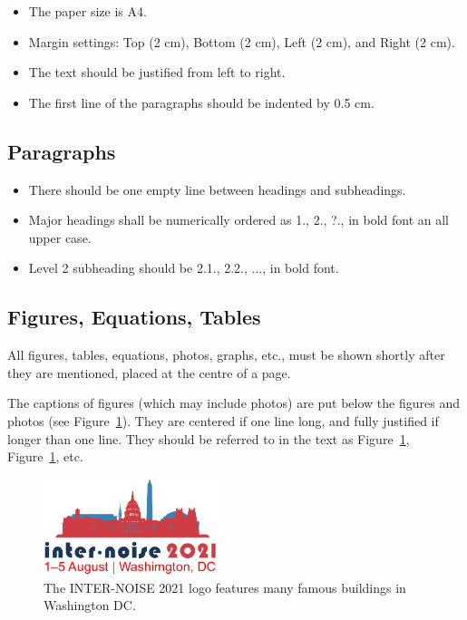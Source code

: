 \begin{itemize}[noitemsep]
\item The paper size is A4.
\item Margin settings: Top (2 cm), Bottom (2 cm), Left (2 cm), and Right (2 cm).
\item The text should be justified from left to right.
\item The first line of the paragraphs should be indented by 0.5 cm. 
\end{itemize}

\subsection{Paragraphs}

\begin{itemize}[noitemsep]
\item There should be one empty line between headings and subheadings.
\item Major headings shall be numerically ordered as 1., 2., ?., in bold font an all upper case.
\item Level 2 subheading should be 2.1., 2.2., ..., in bold font.
\end{itemize}

\subsection{Figures, Equations, Tables} \label{sec.figs}

\noindent
All figures, tables, equations, photos, graphs, etc., must be shown shortly after they are mentioned, placed at the centre of a page. 

The captions of figures (which may include photos) are put below the figures and photos (see Figure~\ref{fig:1}).  They are centered if one line long, and fully justified if longer than one line.  They should be referred to in the text as Figure~\ref{fig:1}, Figure~\ref{fig:1}, etc. 

\begin{figure}[h!]
\begin{center}
  \includegraphics[width=2in,page=2]{internoise-2021.pdf}
  \end{center}
  \caption{The INTER-NOISE 2021 logo features many famous buildings in Washington DC.}
  \label{fig:1}
\end{figure}


